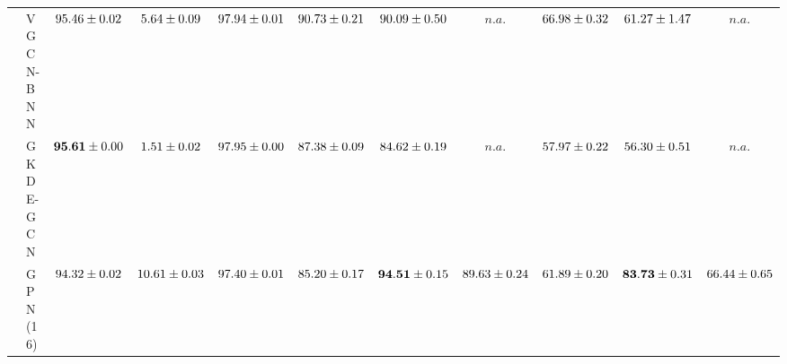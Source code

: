 \begin{table*}[!h]
{\begin{tabular}{ll|cc|cccc|ccc}
        & VGCN-BNN & ${95.46\tiny \pm 0.02}$ & ${5.64\tiny \pm 0.09}$ & ${97.94\tiny \pm 0.01}$ & ${90.73\tiny \pm 0.21}$ & ${90.09\tiny \pm 0.50}$ & $n.a.$ & ${66.98\tiny \pm 0.32}$ & ${61.27\tiny \pm 1.47}$ & $n.a.$\\
        & GKDE-GCN & ${\mathbf{95.61}\tiny \pm 0.00}$ & ${1.51\tiny \pm 0.02}$ & ${97.95\tiny \pm 0.00}$ & ${87.38\tiny \pm 0.09}$ & ${84.62\tiny \pm 0.19}$ & $n.a.$ & ${57.97\tiny \pm 0.22}$ & ${56.30\tiny \pm 0.51}$ & $n.a.$\\
        & GPN(16) & ${94.32\tiny \pm 0.02}$ & ${10.61\tiny \pm 0.03}$ & ${97.40\tiny \pm 0.01}$ & ${85.20\tiny \pm 0.17}$ & ${\mathbf{94.51}\tiny \pm 0.15}$ & ${{89.63}\tiny \pm 0.24}$ & ${61.89\tiny \pm 0.20}$ & ${\mathbf{83.73}\tiny \pm 0.31}$ & ${{66.44}\tiny \pm 0.65}$\\

        \midrule
        

\end{tabular}}
\end{table*}
